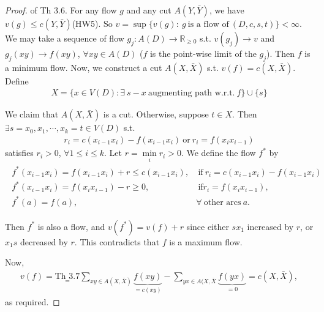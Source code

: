 \begin{proof}
    of Th 3.6. For any flow $g$ and any cut $A(Y, \bar{Y})$, we have $v(g)\leqslant c(Y, \bar{Y})$(HW5). So $v = \sup\{v(g):\ g\ \text{is a flow of}\ (D, c, s, t)\} < \infty$. We may take a sequence of flow $g_j: A(D)\to\mathbb{R}_{\geqslant 0}$ s.t. $v(g_j)\to v$ and $g_j(xy) \to f(xy)$, $\forall xy\in A(D)$ ($f$ is the point-wise limit of the $g_j$). Then $f$ is a minimum flow. Now, we construct a cut $A(X, \bar{X})$ s.t. $v(f) = c(X, \bar{X})$. Define 
    \begin{align*}
        X = \{ x\in V(D): \exists \ s-x\ \text{augmenting path w.r.t.}\ f\}\cup \{s\}
    \end{align*}

    We claim that $A(X, \bar{X})$ is a cut. Otherwise, suppose $t\in X$. Then $\exists s= x_0, x_1, \cdots, x_k = t \in V(D)$ s.t.
    \begin{align*}
        r_i = c(x_{i-1}x_i) - f(x_{i-1}x_i)\  \text{or} \ r_i = f(x_ix_{i-1})
    \end{align*}
    satisfies $r_i>0$, $\forall 1\leqslant i\leqslant k$. Let $r = \min\limits_i r_i >0$. We define the flow $f^*$ by 
    \begin{align*}
    \begin{array}{ll}
        f^*(x_{i-1}x_i) = f(x_{i-1}x_i) + r \leqslant c(x_{i-1}x_i),& \ \text{if}\ r_i = c(x_{i-1}x_i) - f(x_{i-1}x_i) \\
        f^*(x_{i-1}x_i) = f(x_i x_{i-1}) - r \geqslant 0,& \ \text{if} r_i = f(x_ix_{i-1}), \\
        f^*(a) = f(a), &\forall\ \text{other arcs}\ a.
    \end{array}
    \end{align*}

    Then $f^*$ is also a flow, and $v(f^*) = v(f) + r$ since either $sx_1$ increased by $r$, or $x_1 s$ decreased by $r$. This contradicts that $f$ is a maximum flow.

    Now, 
    \begin{align*}
        v(f) = \underset{=}{\text{Th 3.7}} \sum\limits_{xy\in A(X, \bar{X})} \underbrace{f(xy)}\limits_{= c(xy)} - \sum\limits_{yx\in A(X, \bar{X}} \underbrace{f(yx)}\limits_{=0} = c(X, \bar{X}),
    \end{align*}
    as required.
\end{proof}


